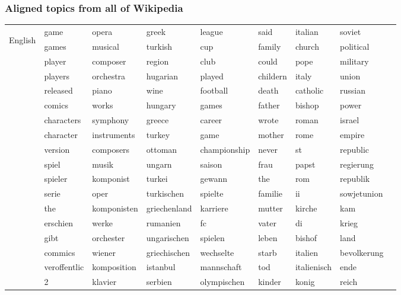 \begin{frame}

\frametitle{Aligned topics from all of Wikipedia}

\center
\scriptsize{
\begin{tabular}{c | p{1cm} p{1.2cm} p{1.2cm} p{1.3cm} p{0.55cm} p{1.0cm} p{1.0cm} p{1.1cm} }
\hline
\multirow{10}{*}{\begin{sideways}English\end{sideways}}
& game & opera & greek & league & said & italian & soviet \\
& games & musical & turkish & cup & family & church & political\\
& player & composer & region & club & could & pope & military\\
& players & orchestra & hugarian & played & childern & italy & union\\
& released & piano & wine & football & death & catholic & russian \\
& comics & works & hungary & games & father & bishop & power \\
& characters & symphony & greece & career & wrote & roman & israel \\
& character & instruments & turkey & game & mother & rome & empire \\
& version & composers & ottoman & championship & never & st & republic \\
\hline
\multirow{10}{*}{\begin{sideways}German\end{sideways}}
 & spiel & musik & ungarn & saison & frau & papst & regierung \\
& spieler & komponist & turkei & gewann & the & rom & republik \\
& serie & oper & turkischen & spielte & familie & ii & sowjetunion \\
& the & komponisten & griechenland & karriere & mutter & kirche & kam \\
& erschien & werke & rumanien & fc & vater & di & krieg \\
& gibt & orchester & ungarischen & spielen & leben & bishof & land \\
& commics & wiener & griechischen & wechselte & starb & italien & bevolkerung \\
& veroffentlic & komposition & istanbul & mannschaft & tod & italienisch & ende \\
& 2 & klavier & serbien & olympischen & kinder & konig & reich \\
\hline
\end{tabular}
}

\end{frame}

